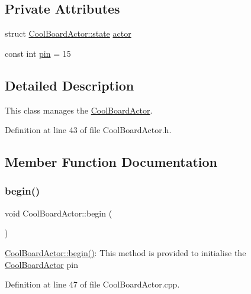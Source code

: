 \subsection*{Private Attributes}
\begin{DoxyCompactItemize}
\item 
struct \hyperlink{struct_cool_board_actor_1_1state}{Cool\+Board\+Actor\+::state} \hyperlink{class_cool_board_actor_a8f190db9f7a39fddbcef7f152da970e9}{actor}
\item 
const int \hyperlink{class_cool_board_actor_a8b5c0b41fe6033b68d9e1ed00bc2e122}{pin} = 15
\end{DoxyCompactItemize}


\subsection{Detailed Description}
This class manages the \hyperlink{class_cool_board_actor}{Cool\+Board\+Actor}. 

Definition at line 43 of file Cool\+Board\+Actor.\+h.



\subsection{Member Function Documentation}
\mbox{\label{class_cool_board_actor_a7f4422fd85a5510bc2cdfd68e109be5e}} 
\subsubsection{\texorpdfstring{begin()}{begin()}}
{\footnotesize\ttfamily void Cool\+Board\+Actor\+::begin (\begin{DoxyParamCaption}{ }\end{DoxyParamCaption})}

\hyperlink{class_cool_board_actor_a7f4422fd85a5510bc2cdfd68e109be5e}{Cool\+Board\+Actor\+::begin()}\+: This method is provided to initialise the \hyperlink{class_cool_board_actor}{Cool\+Board\+Actor} pin 

Definition at line 47 of file Cool\+Board\+Actor.\+cpp.



